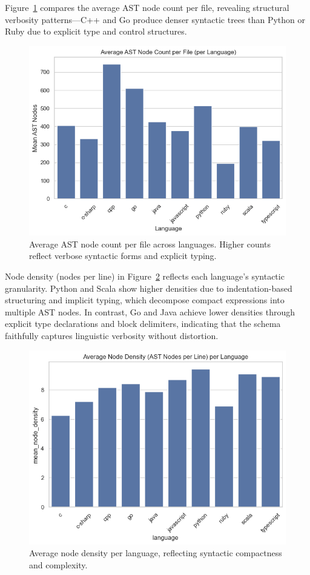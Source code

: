 \documentclass{article}
\begin{document}
Figure~\ref{fig:avg-nodes} compares the average AST node count per file, revealing structural verbosity patterns—C++ and Go produce denser syntactic trees than Python or Ruby due to explicit type and control structures.  

\begin{figure}[H]
\centering
\includegraphics[width=0.6\linewidth]{average_node_by_language.png}
\caption{Average AST node count per file across languages. Higher counts reflect verbose syntactic forms and explicit typing.}
\label{fig:avg-nodes}
\end{figure}

Node density (nodes per line) in Figure~\ref{fig:avg-density} reflects each language’s syntactic granularity. Python and Scala show higher densities due to indentation-based structuring and implicit typing, which decompose compact expressions into multiple AST nodes. In contrast, Go and Java achieve lower densities through explicit type declarations and block delimiters, indicating that the schema faithfully captures linguistic verbosity without distortion.

\begin{figure}[H]
\centering
\includegraphics[width=0.6\linewidth]{average_node_density_by_language.png}
\caption{Average node density per language, reflecting syntactic compactness and complexity.}
\label{fig:avg-density}
\end{figure}
\end{document}
